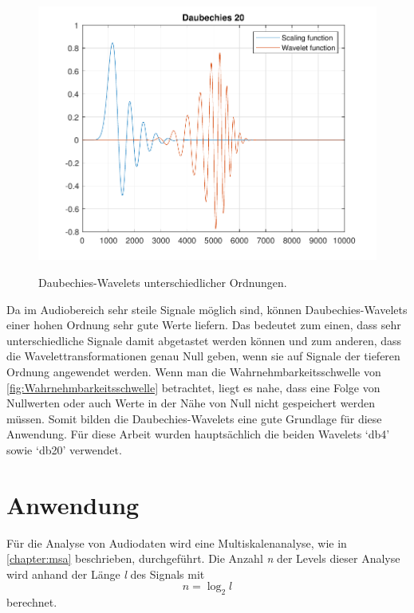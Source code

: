 \begin{refsection}
\begin{figure}
	\includegraphics[width=0.5\linewidth]{papers/compress/Bilder/db20}
	\label{fig:dbN}
	\caption{Daubechies-Wavelets unterschiedlicher Ordnungen.}
\end{figure}

Da im Audiobereich sehr steile Signale möglich sind, können Daubechies-Wavelets einer hohen Ordnung sehr gute Werte liefern.
Das bedeutet zum einen, dass sehr unterschiedliche Signale damit abgetastet werden können und zum anderen, dass die Wavelettransformationen genau Null geben, wenn sie auf Signale der tieferen Ordnung angewendet werden.
Wenn man die Wahrnehmbarkeitsschwelle von \autoref{fig:Wahrnehmbarkeitsschwelle} betrachtet, liegt es nahe, dass eine Folge von Nullwerten oder auch Werte in der Nähe von Null nicht gespeichert werden müssen.
Somit bilden die Daubechies-Wavelets eine gute Grundlage für diese Anwendung.
Für diese Arbeit wurden hauptsächlich die beiden Wavelets `db4' sowie `db20' verwendet.

\section{Anwendung}
Für die Analyse von Audiodaten wird eine Multiskalenanalyse, wie in \autoref{chapter:msa} beschrieben, durchgeführt.
Die Anzahl \textit{n} der Levels dieser Analyse wird anhand der Länge \textit{l} des Signals mit
\begin{equation}
\textit{n} = \log_2{\textit{l}}
\end{equation}
berechnet.


\end{refsection}
